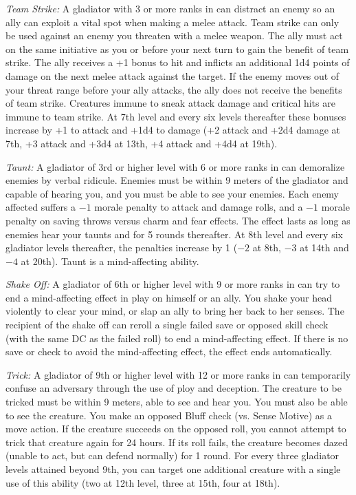 \textit{Team Strike:} A gladiator with 3 or more ranks in  can distract an enemy so an ally can exploit a vital spot when making a melee attack. Team strike can only be used against an enemy you threaten with a melee weapon. The ally must act on the same initiative as you or before your next turn to gain the benefit of team strike. The ally receives a +1 bonus to hit and inflicts an additional 1d4 points of damage on the next melee attack against the target. If the enemy moves out of your threat range before your ally attacks, the ally does not receive the benefits of team strike. Creatures immune to sneak attack damage and critical hits are immune to team strike. At 7th level and every six levels thereafter these bonuses increase by +1 to attack and +1d4 to damage (+2 attack and +2d4 damage at 7th, +3 attack and +3d4 at 13th, +4 attack and +4d4 at 19th).

\textit{Taunt:} A gladiator of 3rd or higher level with 6 or more ranks in  can demoralize enemies by verbal ridicule. Enemies must be within 9 meters of the gladiator and capable of hearing you, and you must be able to see your enemies. Each enemy affected suffers a $-1$ morale penalty to attack and damage rolls, and a $-1$ morale penalty on saving throws versus charm and fear effects. The effect lasts as long as enemies hear your taunts and for 5 rounds thereafter. At 8th level and every six gladiator levels thereafter, the penalties increase by 1 ($-2$ at 8th, $-3$ at 14th and $-4$ at 20th). Taunt is a mind-affecting ability.

\textit{Shake Off:} A gladiator of 6th or higher level with 9 or more ranks in  can try to end a mind-affecting effect in play on himself or an ally. You shake your head violently to clear your mind, or slap an ally to bring her back to her senses. The recipient of the shake off can reroll a single failed save or opposed skill check (with the same DC as the failed roll) to end a mind-affecting effect. If there is no save or check to avoid the mind-affecting effect, the effect ends automatically.

\textit{Trick:} A gladiator of 9th or higher level with 12 or more ranks in  can temporarily confuse an adversary through the use of ploy and deception. The creature to be tricked must be within 9 meters, able to see and hear you. You must also be able to see the creature. You make an opposed Bluff check (vs. Sense Motive) as a move action. If the creature succeeds on the opposed roll, you cannot attempt to trick that creature again for 24 hours. If its roll fails, the creature becomes dazed (unable to act, but can defend normally) for 1 round. For every three gladiator levels attained beyond 9th, you can target one additional creature with a single use of this ability (two at 12th level, three at 15th, four at 18th).

